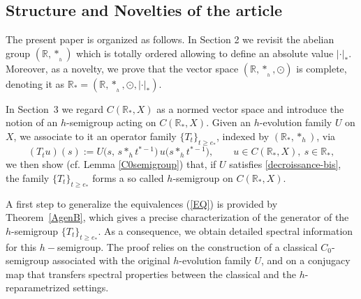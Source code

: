 \documentclass[10pt]{amsart}
\numberwithin{equation}{section}
\begin{document}
\medskip

\subsection{Structure and Novelties of the article} 

\medskip

The present paper is organized as follows. In 
Section 2 we revisit the abelian group $(\mathbb{R},*_{_h})$ which is totally ordered allowing
to define an absolute value $|\cdot |_*$. Moreover, as a novelty, we prove that the vector space $(\mathbb{R},*_{_h},\odot)$ is complete,
denoting it as $\mathbb{R}_* = (\mathbb{R},*_{_h},\odot, | \cdot |_*)$.

In Section~3 we regard $C(\mathbb{R}_*,X)$ as a normed vector space and introduce the notion
of an $h$-semigroup acting on $C(\mathbb{R}_*,X)$. Given an $h$-evolution family $U$ on $X$,
we associate to it an operator family $\{T_t\}_{t\ge e_*}$, indexed by $(\mathbb{R}_*,*_{h})$, via
\[
(T_tu)(s) := U\bigl(s,\,s*_{h}t^{*-1}\bigr)\,u\bigl(s*_{h}t^{*-1}\bigr),
\qquad u\in C(\mathbb{R}_*,X),\ s\in\mathbb{R}_*,
\]
we then show (cf. Lemma \ref{C0semigroup}) that, if $U$ satisfies \eqref{decroissance-bis}, the family
$\{T_t\}_{t\ge e_*}$ forms a so called $h$-semigroup on $C(\mathbb{R}_*,X)$.

A first step to generalize the equivalences (\ref{EQ}) is provided by Theorem~\ref{AgenB}, which gives a precise
characterization of the generator of the $h$-semigroup $\{T_t\}_{t\ge e_*}$. As a
consequence, we obtain detailed spectral information for this $h-$semigroup. The proof
relies on the construction of a classical $C_0$-semigroup associated with the original
$h$-evolution family $U$, and on a conjugacy map that transfers spectral properties
between the classical and the $h$-reparametrized settings.
\end{document}
